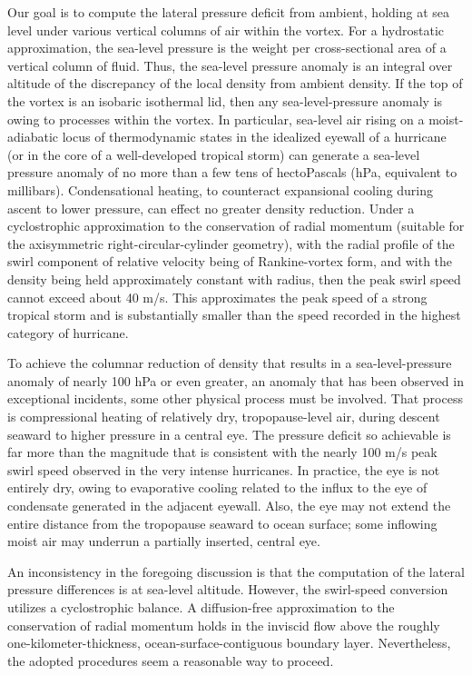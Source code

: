 \documentclass[preprint, prX]{revtex4}
\begin{document}
Our goal is to compute the lateral pressure deficit from ambient, holding at sea level under various vertical columns of air within the vortex. For a hydrostatic approximation, the sea-level pressure is the weight per cross-sectional area of a vertical column of fluid. Thus, the sea-level pressure anomaly is an integral over altitude of the discrepancy of the local density from ambient density. If the top of the vortex is an isobaric isothermal lid, then any sea-level-pressure anomaly is owing to processes within the vortex.
In particular, sea-level air rising on a moist-adiabatic locus of thermodynamic states in the idealized eyewall of a hurricane (or in the core of a well-developed tropical storm) can generate a sea-level pressure anomaly of no more than a few tens of hectoPascals (hPa, equivalent to millibars). Condensational heating, to counteract expansional cooling during ascent to lower pressure, can effect no greater density reduction. Under a cyclostrophic approximation to the conservation of radial momentum (suitable for the axisymmetric right-circular-cylinder geometry), with the radial profile of the swirl component of relative velocity being of Rankine-vortex form, and with the density being held approximately constant with radius, then the peak swirl speed cannot exceed about 40 m/s. This approximates the peak speed of a strong tropical storm and is substantially smaller than the speed recorded in the highest category of hurricane. 

To achieve the columnar reduction of density that results in a sea-level-pressure anomaly of nearly 100 hPa or even greater, an anomaly that has been observed in exceptional incidents, some other physical process must be involved. That process is compressional heating of relatively dry, tropopause-level air, during descent seaward to higher pressure in a central eye.  The pressure deficit so achievable is far more than the magnitude that is consistent with the nearly 100 m/s peak swirl speed observed in the very intense hurricanes. In practice, the eye is not entirely dry, owing to evaporative cooling related to the influx to the eye of condensate generated in the adjacent eyewall. Also, the eye may not extend the entire distance from the tropopause seaward to ocean surface; some inflowing moist air may underrun a partially inserted, central eye.

An inconsistency in the foregoing discussion is that the computation of the lateral pressure differences is at sea-level altitude. However, the swirl-speed conversion utilizes a cyclostrophic balance. A diffusion-free approximation to the conservation of radial momentum holds in the inviscid flow above the roughly one-kilometer-thickness, ocean-surface-contiguous boundary layer. Nevertheless, the adopted procedures seem a reasonable way to proceed. 
\end{document}
